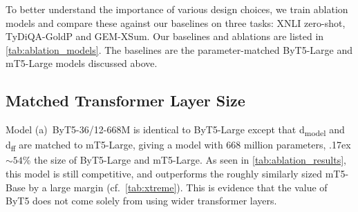 \documentclass[11pt,a4paper]{article}
\newcommand{\bettertilde}{\raise.17ex\hbox{$\scriptstyle\sim$}}
\begin{document}
\begin{table}[t!]
\centering
{}
\caption{Models used in our ablation study.}
\label{tab:ablation_models}
\end{table}

To better understand the importance of various design choices, we train ablation models and compare these against our baselines on three tasks: XNLI zero-shot, TyDiQA-GoldP and \mbox{GEM-XSum}. Our baselines and ablations are listed in \cref{tab:ablation_models}. The baselines are the parameter-matched ByT5-Large and mT5-Large models discussed above.

\subsection{Matched Transformer Layer Size}

Model (a)~ByT5-36/12-668M is identical to ByT5-Large except that d\textsubscript{model} and d\textsubscript{ff} are matched to \mbox{mT5-Large}, giving a model with $668$ million parameters, \bettertilde{}$54$\% the size of \mbox{ByT5-Large} and \mbox{mT5-Large}. As seen in \cref{tab:ablation_results}, this model is still competitive, and outperforms the roughly similarly sized \mbox{mT5-Base} by a large margin (cf.~\cref{tab:xtreme}). This is evidence that the value of ByT5 does not come solely from using wider transformer layers.
\end{document}
